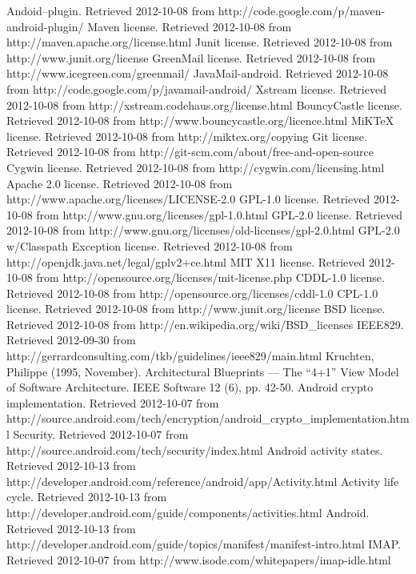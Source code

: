 \documentclass[12pt]{report}
\begin{document}
\begin{thebibliography}{99}
 Andoid--plugin. Retrieved 2012-10-08 from http://code.google.com/p/maven-android-plugin/
 Maven license. Retrieved 2012-10-08 from http://maven.apache.org/license.html
 Junit license. Retrieved 2012-10-08 from http://www.junit.org/license
 GreenMail license. Retrieved 2012-10-08 from http://www.icegreen.com/greenmail/
 JavaMail-android. Retrieved 2012-10-08 from http://code.google.com/p/javamail-android/
 Xstream license. Retrieved 2012-10-08 from http://xstream.codehaus.org/license.html
 BouncyCastle license. Retrieved 2012-10-08 from http://www.bouncycastle.org/licence.html
 MiKTeX license. Retrieved 2012-10-08 from http://miktex.org/copying
 Git license. Retrieved 2012-10-08 from http://git-scm.com/about/free-and-open-source
 Cygwin license. Retrieved 2012-10-08 from http://cygwin.com/licensing.html
 Apache 2.0 license. Retrieved 2012-10-08 from http://www.apache.org/licenses/LICENSE-2.0
 GPL-1.0 license. Retrieved 2012-10-08 from http://www.gnu.org/licenses/gpl-1.0.html
 GPL-2.0 license. Retrieved 2012-10-08 from http://www.gnu.org/licenses/old-licenses/gpl-2.0.html
 GPL-2.0 w/Classpath Exception license. Retrieved 2012-10-08 from http://openjdk.java.net/legal/gplv2+ce.html
 MIT X11 license. Retrieved 2012-10-08 from http://opensource.org/licenses/mit-license.php
 CDDL-1.0 license. Retrieved 2012-10-08 from http://opensource.org/licenses/cddl-1.0
 CPL-1.0 license. Retrieved 2012-10-08 from http://www.junit.org/license
 BSD license. Retrieved 2012-10-08 from http://en.wikipedia.org/wiki/BSD\_licenses
 IEEE829. Retrieved  2012-09-30 from http://gerrardconsulting.com/tkb/guidelines/ieee829/main.html
 Kruchten, Philippe (1995, November). Architectural Blueprints — The “4+1” View Model of Software Architecture. IEEE Software 12 (6), pp. 42-50.
 Android crypto implementation. Retrieved 2012-10-07 from http://source.android.com/tech/encryption/android\_crypto\_implementation.html
 Security. Retrieved 2012-10-07 from http://source.android.com/tech/security/index.html
 Android activity states. Retrieved 2012-10-13 from http://developer.android.com/reference/android/app/Activity.html
 Activity life cycle. Retrieved 2012-10-13 from http://developer.android.com/guide/components/activities.html
 Android. Retrieved 2012-10-13 from http://developer.android.com/guide/topics/manifest/manifest-intro.html
 IMAP. Retrieved 2012-10-07 from http://www.isode.com/whitepapers/imap-idle.html
\end{thebibliography}
\end{document}
